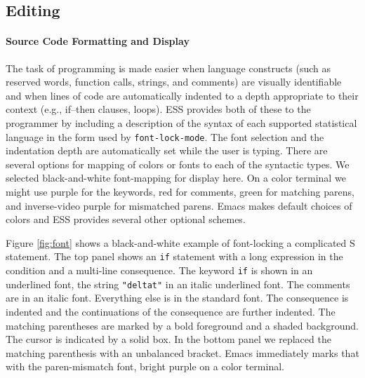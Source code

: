 \documentclass{article}
\newcommand{\stexttt}[1]{{\small\texttt{#1}}}
\begin{document}
\subsection{Editing}
\label{sec:ESS:features}

\paragraph{Source Code Formatting and Display}
The task of programming is made easier when language constructs (such
as reserved words, function calls, strings, and comments) are visually
identifiable and when lines of code are automatically indented to a
depth appropriate to their context (e.g., if--then clauses, loops).
ESS provides both of these to the programmer by including a
description of the syntax of each supported statistical language in
the form used by \stexttt{font-lock-mode}.  The font selection and the
indentation depth are automatically set while the user is typing.
There are several options for mapping of colors or fonts to each of
the syntactic types.  We selected black-and-white font-mapping for
display here.  On a color terminal we might use purple for the
keywords, red for comments, green for matching parens, and
inverse-video purple for mismatched parens.  Emacs makes default
choices of colors and ESS provides several other optional schemes.


Figure \ref{fig:font} shows a black-and-white example of font-locking a
complicated S statement.  The top panel shows an \stexttt{if}
statement with a long expression in the condition and a multi-line
consequence.  The keyword \stexttt{if} is shown in an underlined font,
the string \stexttt{"deltat"} in an italic underlined font.  The
comments are in an italic font.  Everything else is in the standard
font.  The consequence is indented and the continuations of the
consequence are further indented.  The matching parentheses are marked
by a bold foreground and a shaded background.  The cursor is indicated
by a solid box.  In the bottom panel we replaced the matching
parenthesis with an unbalanced bracket.  Emacs immediately marks that
with the paren-mismatch font, bright purple on a color terminal.
\end{document}
